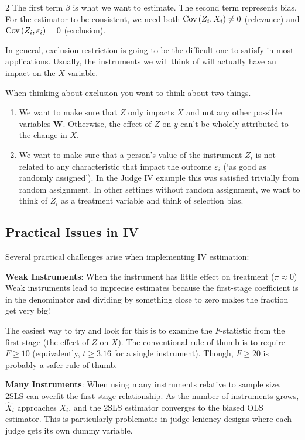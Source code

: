 \documentclass[12pt]{article}
\begin{document}
\begin{multicols}{2}
The first term $\beta$ is what we want to estimate.
The second term represents bias.
For the estimator to be consistent, we need both $\cov{Z_i, X_i} \neq 0$ (relevance) and $\cov{Z_i, \varepsilon_i} = 0$ (exclusion).

In general, exclusion restriction is going to be the difficult one to satisfy in most applications. 
Usually, the instruments we will think of will actually have an impact on the $X$ variable. 

When thinking about exclusion you want to think about two things.
\begin{enumerate}
  \item We want to make sure that $Z$ only impacts $X$ and not any other possible variables $\bm{W}$. 
  Otherwise, the effect of $Z$ on $y$ can't be wholely attributed to the change in $X$.

  \item We want to make sure that a person's value of the instrument $Z_i$ is not related to any characteristic that impact the outcome $\varepsilon_i$ (`as good as randomly assigned'). 
  In the Judge IV example this was satisfied trivially from random assignment. 
  In other settings without random assignment, we want to think of $Z_i$ as a treatment variable and think of selection bias.
\end{enumerate}

\subsection*{Practical Issues in IV}

Several practical challenges arise when implementing IV estimation:

\textbf{Weak Instruments}: When the instrument has little effect on treatment ($\pi \approx 0$)
Weak instruments lead to imprecise estimates because the first-stage coefficient is in the denominator and dividing by something close to zero makes the fraction get very big!

The easiest way to try and look for this is to examine the $F$-statistic from the first-stage (the effect of $Z$ on $X$). 
The conventional rule of thumb is to require $F \geq 10$ (equivalently, $t \geq 3.16$ for a single instrument).
Though, $F \geq 20$ is probably a safer rule of thumb.


\textbf{Many Instruments}: When using many instruments relative to sample size, 2SLS can overfit the first-stage relationship.
As the number of instruments grows, $\hat{X}_i$ approaches $X_i$, and the 2SLS estimator converges to the biased OLS estimator.
This is particularly problematic in judge leniency designs where each judge gets its own dummy variable.


\end{multicols}
\end{document}

